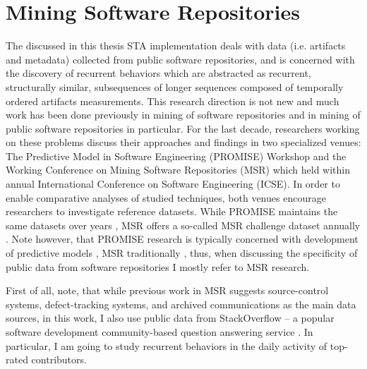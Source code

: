 \section{Mining Software Repositories}
The discussed in this thesis STA implementation deals with data (i.e. artifacts and metadata) collected from public software 
repositories, and is concerned with the discovery of recurrent behaviors which are abstracted as recurrent, structurally 
similar, subsequences of longer sequences composed of temporally ordered artifacts measurements. 
This research direction is not new and much work has been done previously in mining of software repositories and in mining 
of public software repositories in particular. 
For the last decade, researchers working on these problems discuss their approaches and findings in two specialized venues: 
The Predictive Model in Software Engineering (PROMISE) Workshop and the Working Conference on Mining Software Repositories 
(MSR) which held within annual International Conference on Software Engineering (ICSE).
In order to enable comparative analyses of studied techniques, both venues encourage researchers to investigate 
reference datasets. While PROMISE maintains the same datasets over years \cite{promise12}, MSR offers a so-called 
MSR challenge dataset annually \cite{MSRChallenge2013}.
Note however, that PROMISE research is typically concerned with development of predictive models \cite{Menzies13},
MSR traditionally \cite{citeulike:12550438} \cite{citeulike:2710928} \cite{citeulike:7853299}, thus, when discussing the 
specificity of public data from software repositories I mostly refer to MSR research.

First of all, note, that while previous work in MSR \cite{citeulike:4534888} suggests source-control systems, 
defect-tracking systems, and archived communications as the main data sources, in this work, I also use public data from 
StackOverflow -- a popular software development community-based question answering service \cite{MSRChallenge2013}.
In particular, I am going to study recurrent behaviors in the daily activity of top-rated contributors.

